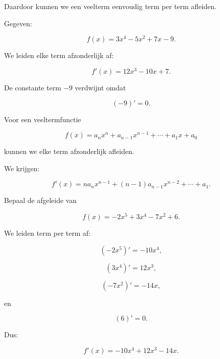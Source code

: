 \documentclass{ximera}
\begin{document}
Daardoor kunnen we een veelterm eenvoudig term per term afleiden.


\begin{voorbeeld}

Gegeven:

\[
f(x)=3x^4-5x^2+7x-9.
\]

We leiden elke term afzonderlijk af:

\[
f'(x)
=
12x^3-10x+7.
\]

De constante term $-9$ verdwijnt omdat

\[
(-9)'=0.
\]

\end{voorbeeld}







Voor een veeltermfunctie

\[
f(x)
=
a_nx^n+a_{n-1}x^{n-1}+\cdots+a_1x+a_0
\]

kunnen we elke term afzonderlijk afleiden.

We krijgen:

\[
\boxed{
f'(x)
=
na_nx^{n-1}
+(n-1)a_{n-1}x^{n-2}
+\cdots
+a_1.
}
\]


\begin{voorbeeld}

Bepaal de afgeleide van

\[
f(x)
=
-2x^5+3x^4-7x^2+6.
\]

\begin{oplossing}[toon]

We leiden term per term af:

\[
(-2x^5)'=-10x^4,
\]

\[
(3x^4)'=12x^3,
\]

\[
(-7x^2)'=-14x,
\]

en

\[
(6)'=0.
\]

Dus:

\[
\boxed{
f'(x)
=
-10x^4+12x^3-14x.
}
\]

\end{oplossing}

\end{voorbeeld}
\end{document}
